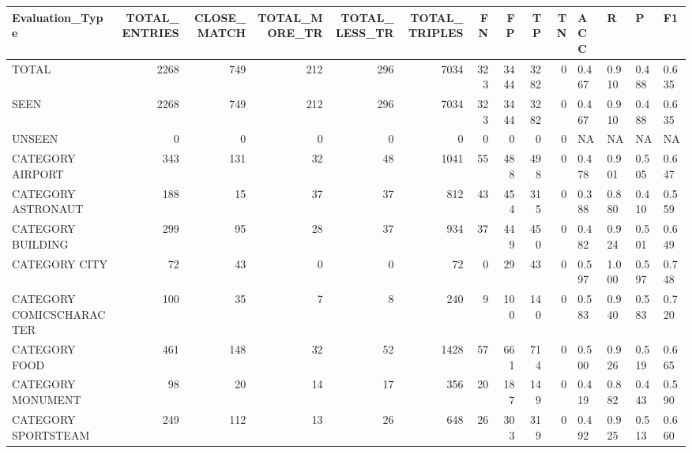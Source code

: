 \begin{tabular}{lrrrrrrrrrllll}
\hline
 Evaluation\_Type          &   TOTAL\_ENTRIES &   CLOSE\_MATCH &   TOTAL\_MORE\_TR &   TOTAL\_LESS\_TR &   TOTAL\_TRIPLES &   FN &   FP &   TP &   TN & ACC   & R     & P     & F1    \\
\hline
 TOTAL                    &            2268 &           749 &             212 &             296 &            7034 &  323 & 3444 & 3282 &    0 & 0.467 & 0.910 & 0.488 & 0.635 \\
 SEEN                     &            2268 &           749 &             212 &             296 &            7034 &  323 & 3444 & 3282 &    0 & 0.467 & 0.910 & 0.488 & 0.635 \\
 UNSEEN                   &               0 &             0 &               0 &               0 &               0 &    0 &    0 &    0 &    0 & NA    & NA    & NA    & NA    \\
 CATEGORY AIRPORT         &             343 &           131 &              32 &              48 &            1041 &   55 &  488 &  498 &    0 & 0.478 & 0.901 & 0.505 & 0.647 \\
 CATEGORY ASTRONAUT       &             188 &            15 &              37 &              37 &             812 &   43 &  454 &  315 &    0 & 0.388 & 0.880 & 0.410 & 0.559 \\
 CATEGORY BUILDING        &             299 &            95 &              28 &              37 &             934 &   37 &  449 &  450 &    0 & 0.482 & 0.924 & 0.501 & 0.649 \\
 CATEGORY CITY            &              72 &            43 &               0 &               0 &              72 &    0 &   29 &   43 &    0 & 0.597 & 1.000 & 0.597 & 0.748 \\
 CATEGORY COMICSCHARACTER &             100 &            35 &               7 &               8 &             240 &    9 &  100 &  140 &    0 & 0.583 & 0.940 & 0.583 & 0.720 \\
 CATEGORY FOOD            &             461 &           148 &              32 &              52 &            1428 &   57 &  661 &  714 &    0 & 0.500 & 0.926 & 0.519 & 0.665 \\
 CATEGORY MONUMENT        &              98 &            20 &              14 &              17 &             356 &   20 &  187 &  149 &    0 & 0.419 & 0.882 & 0.443 & 0.590 \\
 CATEGORY SPORTSTEAM      &             249 &           112 &              13 &              26 &             648 &   26 &  303 &  319 &    0 & 0.492 & 0.925 & 0.513 & 0.660 \\

\end{tabular}
